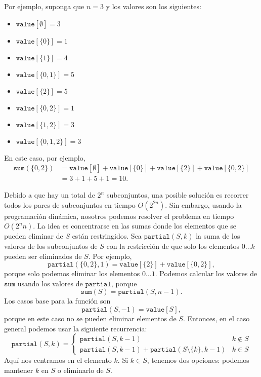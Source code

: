 Por ejemplo, suponga que $n=3$ y los valores son los siguientes:
\begin{multicols}{2}
\begin{itemize}
\item $\texttt{value}[\emptyset] = 3$
\item $\texttt{value}[\{0\}] = 1$
\item $\texttt{value}[\{1\}] = 4$
\item $\texttt{value}[\{0,1\}] = 5$
\item $\texttt{value}[\{2\}] = 5$
\item $\texttt{value}[\{0,2\}] = 1$
\item $\texttt{value}[\{1,2\}] = 3$
\item $\texttt{value}[\{0,1,2\}] = 3$
\end{itemize}
\end{multicols}
En este caso, por ejemplo,
\begin{equation*}
\begin{split}
\texttt{sum}(\{0,2\}) &= \texttt{value}[\emptyset]+\texttt{value}[\{0\}]+\texttt{value}[\{2\}]+\texttt{value}[\{0,2\}] \\ 
                      &= 3 + 1 + 5 + 1 = 10.
\end{split}
\end{equation*}

Debido a que hay un total de $2^n$ subconjuntos,
una posible solución es recorrer todos
los pares de subconjuntos en tiempo $O(2^{2n})$.
Sin embargo, usando la programación dinámica, nosotros
podemos resolver el problema en tiempo $O(2^n n)$.
La idea es concentrarse en las sumas donde
los elementos que se pueden eliminar de $S$ están restringidos.
Sea $\texttt{partial}(S,k)$ la suma de
los valores de los subconjuntos de $S$ con la restricción
de que solo los elementos $0 \ldots k$
pueden ser eliminados de $S$.
Por ejemplo,
\[\texttt{partial}(\{0,2\},1)=\texttt{value}[\{2\}]+\texttt{value}[\{0,2\}],\]
porque solo podemos eliminar los elementos $0 \ldots 1$.
Podemos calcular los valores de $\texttt{sum}$ usando
los valores de $\texttt{partial}$, porque
\[\texttt{sum}(S) = \texttt{partial}(S,n-1).\]
Los casos base para la función son
\[\texttt{partial}(S,-1)=\texttt{value}[S],\]
porque en este caso no se pueden eliminar elementos de $S$.
Entonces, en el caso general podemos usar la siguiente recurrencia:
\begin{equation*}
    \texttt{partial}(S,k) = \begin{cases}
               \texttt{partial}(S,k-1) & k \notin S \\
               \texttt{partial}(S,k-1) + \texttt{partial}(S \setminus \{k\},k-1) & k \in S
           \end{cases}
\end{equation*}
Aquí nos centramos en el elemento $k$.
Si $k \in S$, tenemos dos opciones: podemos mantener $k$ en $S$
o eliminarlo de $S$.

